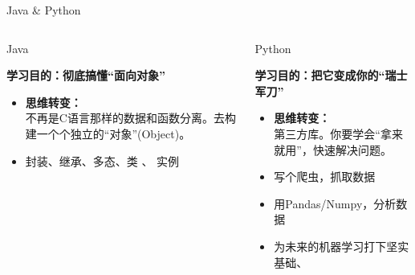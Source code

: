 \documentclass{beamer}
\begin{document}
\begin{frame}{Java \& Python}

    \begin{columns}[T]
        \begin{column}{0.5\textwidth}
            \begin{center}
                \huge Java
                \vspace{0.3cm}
                
                \large\textbf{学习目的：彻底搞懂“面向对象”}
            \end{center}
            \begin{itemize}
                \item  \textbf{思维转变：} \\
                不再是C语言那样的数据和函数分离。去构建一个个独立的\alert{“对象”(Object)}。
                
                \item 封装、继承、多态、类 、 实例
            \end{itemize}
        \end{column}
        
        \begin{column}{0.5\textwidth}
            \begin{center}
                \huge Python
                \vspace{0.3cm}
                
                \large\textbf{学习目的：把它变成你的“瑞士军刀”}
            \end{center}
            \begin{itemize}
                \item \textbf{思维转变：} \\
                第三方库。你要学会“拿来就用”，快速解决问题。

                \item 写个爬虫，抓取数据
                    \item 用Pandas/Numpy，分析数据
                    \item 为未来的\alert{机器学习}打下坚实基础、
            \end{itemize}
        \end{column}
    \end{columns}

\end{frame}
\end{document}
